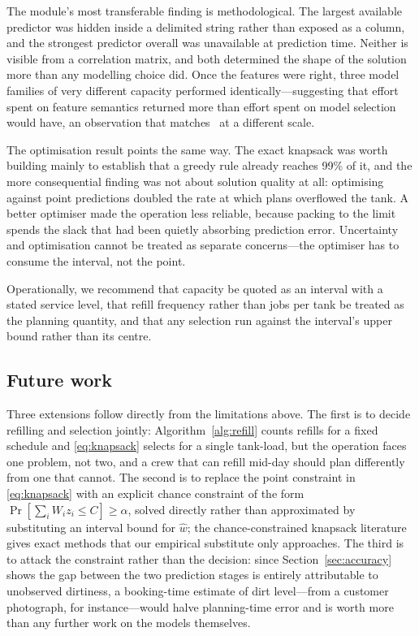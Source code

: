 \documentclass[conference]{IEEEtran}
\begin{document}
The module's most transferable finding is methodological. The largest available predictor was
hidden inside a delimited string rather than exposed as a column, and the strongest predictor
overall was unavailable at prediction time. Neither is visible from a correlation matrix, and
both determined the shape of the solution more than any modelling choice did. Once the features
were right, three model families of very different capacity performed identically---suggesting
that effort spent on feature semantics returned more than effort spent on model selection would
have, an observation that matches~\cite{donkor2014demand} at a different scale.

The optimisation result points the same way. The exact knapsack was worth building mainly to
establish that a greedy rule already reaches 99\% of it, and the more consequential finding was
not about solution quality at all: optimising against point predictions doubled the rate at
which plans overflowed the tank. A better optimiser made the operation less reliable, because
packing to the limit spends the slack that had been quietly absorbing prediction error.
Uncertainty and optimisation cannot be treated as separate concerns---the optimiser has to
consume the interval, not the point.

Operationally, we recommend that capacity be quoted as an interval with a stated service level,
that refill frequency rather than jobs per tank be treated as the planning quantity, and that any
selection run against the interval's upper bound rather than its centre.

\subsection{Future work}

Three extensions follow directly from the limitations above. The first is to decide refilling
and selection jointly: Algorithm~\ref{alg:refill} counts refills for a fixed schedule and
\eqref{eq:knapsack} selects for a single tank-load, but the operation faces one problem, not
two, and a crew that can refill mid-day should plan differently from one that cannot. The
second is to replace the point constraint in \eqref{eq:knapsack} with an explicit chance
constraint of the form $\Pr[\sum_i W_i z_i \le C] \ge \alpha$, solved directly rather than
approximated by substituting an interval bound for $\hat{w}$; the chance-constrained knapsack
literature~\cite{han2015chance} gives exact methods that our empirical substitute only
approaches. The third is to attack the constraint rather than the decision: since
Section~\ref{sec:accuracy} shows the gap between the two prediction stages is entirely
attributable to unobserved dirtiness, a booking-time estimate of dirt level---from a customer
photograph, for instance---would halve planning-time error and is worth more than any further
work on the models themselves.
\end{document}
